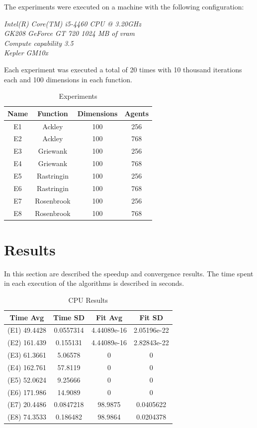 \documentclass[conference]{IEEEtran}
\begin{document}
The experiments were executed on a machine with the following configuration:

\textit{Intel(R) Core(TM) i5-4460  CPU @ 3.20GHz \\ GK208 GeForce GT 720 1024 MB of vram \\ Compute capability 3.5 \\ Kepler GM10x}

Each experiment was executed a total of 20 times with 10 thousand
iterations each and 100 dimensions in each function.

\begin{table}[!htbp]
    \renewcommand{\arraystretch}{1.3}
    \caption{Experiments}
    \label{experiments}
    \centering
    \begin{tabular}{c|c|c|c}
    \hline
        \bf Name & Function &  Dimensions & Agents\\
    \hline
        E1 & Ackley & 100 & 256\\
        E2 & Ackley & 100 & 768\\
        E3 & Griewank & 100 & 256\\
        E4 & Griewank & 100 & 768\\
        E5 & Rastringin & 100 & 256\\
        E6 & Rastringin & 100 & 768\\
        E7 & Rosenbrook & 100 & 256\\
        E8 & Rosenbrook & 100 & 768\\
    \end{tabular}
\end{table}


\section{Results} \label{results}%

In this section are described the speedup and convergence results. The
time spent in each execution of the algorithms is described in seconds.

\begin{table}[!t]
    \renewcommand{\arraystretch}{1.3}
    \caption{CPU Results}
    \label{results-cpu}
    \centering
    \begin{tabular}{c|c|c|c}
    \hline
        Time Avg & Time SD & Fit Avg & Fit SD\\
    \hline
        (E1) 49.4428 & 0.0557314 & 4.44089e-16 & 2.05196e-22 \\
        (E2) 161.439 & 0.155131 & 4.44089e-16 & 2.82843e-22 \\
        (E3) 61.3661 & 5.06578   & 0  & 0 \\
        (E4) 162.761 & 57.8119 & 0 & 0 \\
        (E5) 52.0624 & 9.25666   & 0  & 0 \\
        (E6) 171.986 & 14.9089 & 0 & 0 \\
        (E7) 20.4486 & 0.0847218 & 98.9875 & 0.0405622 \\
        (E8) 74.3533 & 0.186482 & 98.9864 & 0.0204378 \\
    \end{tabular}
\end{table}
\end{document}
